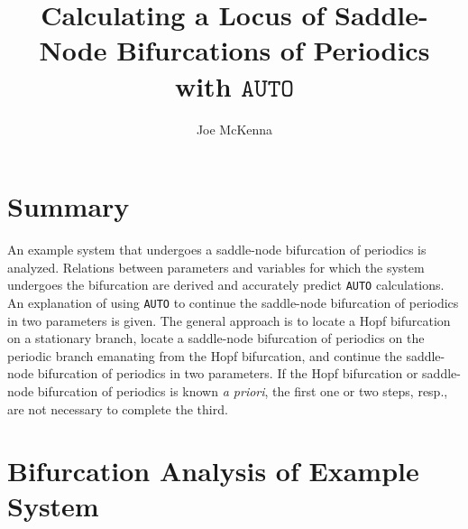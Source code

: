 \documentclass[a4paper,11pt]{article}
\begin{document}
\title{Calculating a Locus of Saddle-Node Bifurcations of Periodics with $\texttt{AUTO}$}
\author{Joe McKenna}
\date{}
\maketitle

\section*{Summary}

An example system that undergoes a saddle-node bifurcation of periodics is analyzed. Relations between parameters and variables for which the system undergoes the bifurcation are derived and accurately predict \texttt{AUTO} calculations. An explanation of using \texttt{AUTO} to continue the saddle-node bifurcation of periodics in two parameters is given. The general approach is to locate a Hopf bifurcation on a stationary branch, locate a saddle-node bifurcation of periodics on the periodic branch emanating from the Hopf bifurcation, and continue the saddle-node bifurcation of periodics in two parameters. If the Hopf bifurcation or saddle-node bifurcation of periodics is known \emph{a priori}, the first one or two steps, resp., are not necessary to complete the third.

\section*{Bifurcation Analysis of Example System}
\end{document}
